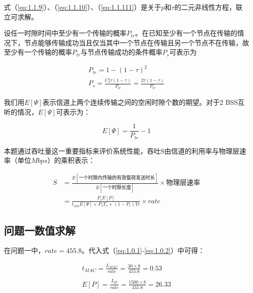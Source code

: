 \documentclass[bwprint]{gmcmthesis}
\begin{document}
式（\ref{eq:1.1.9}）、（\ref{eq:1.1.10}）、（\ref{eq:1.1.111}）是关于$p$和$\tau$的二元非线性方程，联立可求解。

设任一时隙时间中至少有一个传输的概率$P_{tr}$。在已知至少有一个节点在传输的情况下，节点能够传输成功当且仅当其中一个节点在传输且另一个节点不在传输，故至少有一个传输的概率$P_{tr}$与节点传输成功的条件概率$P_s$可表示为

\begin{equation}
\begin{array}{l}
P_{tr}=1-(1-\tau)^2 \\
P_s=\displaystyle \frac{C_2^1\tau(1-\tau)}{P_{tr}} =\displaystyle\frac{2\tau(1-\tau)}{P_{tr}}
\end{array}
    \label{eq:1.1.1111}
\end{equation}

我们用$E[\Psi ]$表示信道上两个连续传输之间的空闲时隙个数的期望。对于2 BSS互听的情况，$E[\Psi ]$可表示为：

\begin{equation}
E[\Psi ] = \frac{1}{P_{tr} }-1 
    \label{eq:1.1.11111}
\end{equation}

本题通过吞吐量这一重要指标来评价系统性能，吞吐S由信道的利用率与物理层速率（单位$Mbps$）的乘积表示：

\begin{equation}
\begin{aligned}
S&=\frac{E[\mbox{一个时隙内传输的有效载荷发送时长}]}{E[\mbox{一个时隙长度}]}\times \mbox{物理层速率}\\
&=\frac{P_sE[P]}{t_{slot}E[\Psi ]+P_sT_s+(1-P_s)Tc} \times rate
\end{aligned}
    \label{eq:1.1.12}
\end{equation}

\subsection{问题一数值求解}

在问题一中，$rate = 455.8$。代入式（\ref{eq:1.0.1}-\ref{eq:1.0.2}）中可得：

\begin{equation}
\begin{matrix}
t_{MAC} =\displaystyle \frac{L_{MAC}}{rate} =\displaystyle \frac{30\times8}{455.8}=0.53 \\
\\
E[P] =\displaystyle \frac{L_{pl}}{rate} =\displaystyle \frac{1500\times8}{455.8}=26.33
\end{matrix}
\label{eq:1.1.121}
\end{equation}
\end{document}
